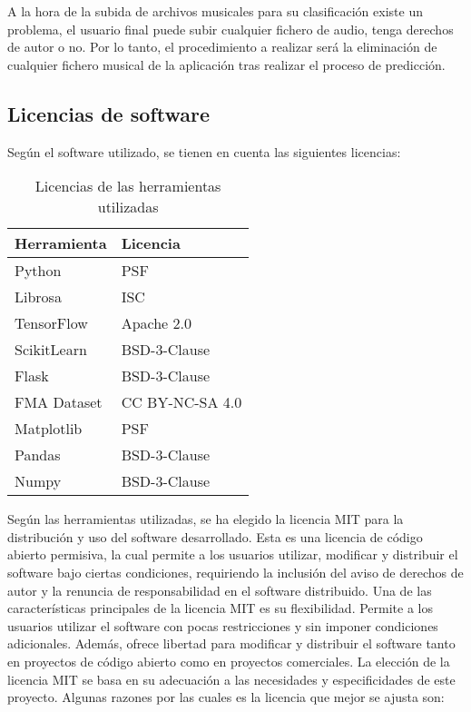 A la hora de la subida de archivos musicales para su clasificación existe un problema, el usuario final puede subir cualquier fichero de audio, tenga derechos de autor o no. Por lo tanto, el procedimiento a realizar será la eliminación de cualquier fichero musical de la aplicación tras realizar el proceso de predicción.

\subsection{Licencias de software}

Según el software utilizado, se tienen en cuenta las siguientes licencias: \cite{Creative_Commons, Open_Source_Initiative_2023}

\begin{table}[h]
\centering
\caption{Licencias de las herramientas utilizadas}
\begin{tabular}{|l|l|}
\hline
\textbf{Herramienta} & \textbf{Licencia} \\
\hline
Python \cite{3.10_Documentation} & PSF \\
Librosa \cite{librosa} & ISC \\
TensorFlow \cite{TensorFlow} & Apache 2.0 \\
ScikitLearn \cite{scikit} & BSD-3-Clause \\
Flask \cite{Flask} & BSD-3-Clause \\
FMA Dataset \cite{fma_dataset} & CC BY-NC-SA 4.0 \\
Matplotlib \cite{matplotlib} & PSF \\
Pandas \cite{pandas} & BSD-3-Clause \\
Numpy \cite{NumPy} & BSD-3-Clause \\
\hline
\end{tabular}
\end{table}

Según las herramientas utilizadas, se ha elegido la licencia MIT para la distribución y uso del software desarrollado. Esta es una licencia de código abierto permisiva, la cual permite a los usuarios utilizar, modificar y distribuir el software bajo ciertas condiciones, requiriendo la inclusión del aviso de derechos de autor y la renuncia de responsabilidad en el software distribuido.
Una de las características principales de la licencia MIT es su flexibilidad. Permite a los usuarios utilizar el software con pocas restricciones y sin imponer condiciones adicionales. Además, ofrece libertad para modificar y distribuir el software tanto en proyectos de código abierto como en proyectos comerciales.
La elección de la licencia MIT se basa en su adecuación a las necesidades y especificidades de este proyecto. Algunas razones por las cuales es la licencia que mejor se ajusta son:

